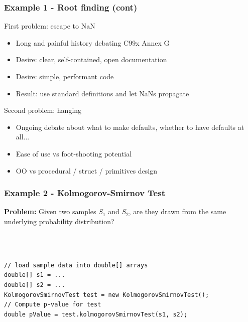 \documentclass[14pt,mathserif]{beamer}
\begin{document}
\begin{frame}[fragile]
  \frametitle{Example 1 - Root finding (cont)}

\begin{small}  
 First problem:  escape to NaN
\begin{itemize}
  \item Long and painful history debating C99x Annex G
  \item Desire: clear, self-contained, open documentation
  \item Desire: simple, performant code
  \item Result: use standard definitions and let NaNs propagate
\end{itemize}
Second problem: hanging
\begin{itemize}
  \item Ongoing debate about what to make defaults, whether to have defaults at all...
  \item Ease of use vs foot-shooting potential
  \item OO vs procedural / struct / primitives design
\end{itemize}
\end{small}
\end{frame} 
\begin{frame}[fragile]
  \frametitle{Example 2 - Kolmogorov-Smirnov Test}

\begin{small}
\textbf{Problem:}  Given two samples \(S_1\) and \(S_2\), are they drawn from the
same underlying probability distribution?
\end{small}
\\
\begin{verbatim}

// load sample data into double[] arrays
double[] s1 = ... 
double[] s2 = ...
KolmogorovSmirnovTest test = new KolmogorovSmirnovTest();
// Compute p-value for test
double pValue = test.kolmogorovSmirnovTest(s1, s2);

\end{verbatim}
\end{frame}
\end{document}
